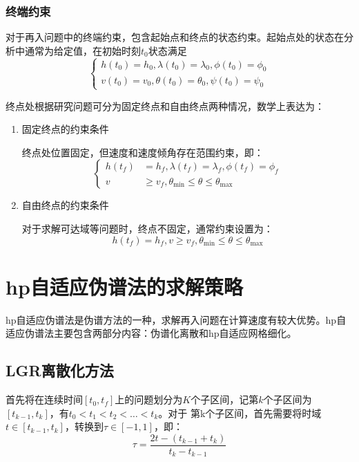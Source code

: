 \subsubsection{终端约束}
对于再入问题中的终端约束，包含起始点和终点的状态约束。起始点处的状态在分析中通常为给定值，在初始时刻$ t_0 $状态满足
\begin{equation}
	\left\{ \begin{aligned}
		h(t_0)=h_0,\lambda(t_0)=\lambda_0,\phi(t_0)=\phi_0 \\
		v(t_0)=v_0,\theta(t_0)=\theta_0,\psi(t_0)=\psi_0
	\end{aligned} \right.
\end{equation}

终点处根据研究问题可分为固定终点和自由终点两种情况，数学上表达为：
\begin{enumerate}
	\item 固定终点的约束条件\par
	      终点处位置固定，但速度和速度倾角存在范围约束，即：
	      \begin{equation}
		      \left\{ \begin{aligned}
			      h(t_f) & =h_{f}, \lambda(t_f)=\lambda_{f}, \phi(t_f)=\phi_{f}       \\
			      v      & \geq v_{f}, \theta_{\min } \leq \theta \leq \theta_{\max }
		      \end{aligned}\right.
	      \end{equation}
	\item 自由终点的约束条件\par
	      对于求解可达域等问题时，终点不固定，通常约束设置为：
	      \begin{equation}
		      h(t_f)=h_{f}, v \geq v_{f}, \theta_{\min } \leq \theta \leq \theta_{\max }
	      \end{equation}
\end{enumerate}

\section{hp自适应伪谱法的求解策略}
hp自适应伪谱法是伪谱方法的一种，求解再入问题在计算速度有较大优势。hp自适应伪谱法主要包含两部分内容：伪谱化离散和hp自适应网格细化。
\subsection{LGR离散化方法}
首先将在连续时间$ [t_0,t_f] $上的问题划分为$ K $个子区间，记第$ k $个子区间为$ [t_{k-1},t_k] $，有$ t_0<t_1<t_2<\ldots<t_k $。对于
第k个子区间，首先需要将时域$ t\in[t_{k-1},t_k] $，转换到$ \tau \in [-1,1] $，即：
\begin{equation}
	\tau = \frac{2 t-\left(t_{k-1}+t_{k}\right)}{t_{k}-t_{k-1}}
	\label{eq:time Trans}
\end{equation}

